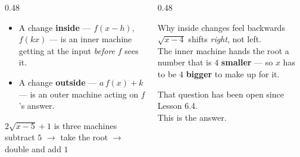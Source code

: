 \documentclass[aspectratio=169, 11pt]{beamer}
\begin{document}
\begin{frame}[t, plain]
  \begin{columns}[T]
    \begin{column}{0.48\textwidth}
      \footnotesize
      \begin{itemize}\setlength{\itemsep}{4pt}
        \item A change \textbf{inside} --- $f(x-h)$, $f(kx)$ --- is an inner machine getting at the
              input \emph{before} $f$ sees it.
        \item A change \textbf{outside} --- $a\,f(x)+k$ --- is an outer machine acting on $f$'s
              answer.
      \end{itemize}
      \vspace{5pt}
      \begin{block}{$2\sqrt{x-5}+1$ is three machines}
        subtract $5$ \; $\rightarrow$ \; take the root \; $\rightarrow$ \; double and add $1$
      \end{block}
    \end{column}
    \begin{column}{0.48\textwidth}
      \footnotesize
      \begin{block}{Why inside changes feel backwards}
        $\sqrt{x-4}$ shifts \emph{right}, not left. \\[4pt]
        The inner machine hands the root a number that is $4$ \textbf{smaller} --- so $x$ has to be
        $4$ \textbf{bigger} to make up for it.
      \end{block}
      \vspace{4pt}
      \begin{center}
      That question has been open since Lesson 6.4. \\ This is the answer.
      \end{center}
    \end{column}
  \end{columns}
\end{frame}
\end{document}
